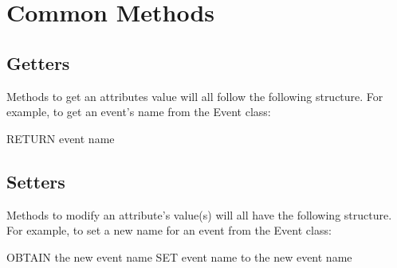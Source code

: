 \section{Common Methods}

\subsection{Getters}

Methods to get an attributes value will all follow the following structure. For example, to get an event's name from the Event class:

\begin{pc}
RETURN event name
\end{pc}

\subsection{Setters}

Methods to modify an attribute's value(s) will all have the following structure. For example, to set a new name for an event from the Event class:

\begin{pc}
OBTAIN the new event name
SET event name to the new event name
\end{pc}
